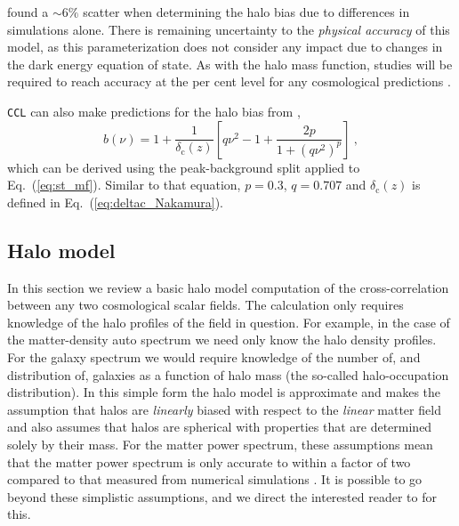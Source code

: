 \documentclass[\docopts]{\docclass}
\newcommand{\ccl}{{\tt CCL}\xspace}
\begin{document}
\citet{Tinker2010} found a $\sim6\%$ scatter when determining the halo bias due to differences in simulations alone. There is remaining uncertainty to the {\em physical accuracy} of this model, as this parameterization does not consider any impact due to changes in the dark energy equation of state. As with the halo mass function, studies will be required to reach accuracy at the per cent level for any cosmological predictions \cite[e.g.]{Gao2005, Schulz2006, Smith2007, Croton2007, Parfrey2011, Sunayama2016, Villarreal2017, Mao2018}.

\ccl can also make predictions for the halo bias from \cite{Sheth1999},
\begin{equation}
b(\nu)=1+\frac{1}{\delta_\mathrm{c}(z)}\left[q\nu^2-1+\frac{2p}{1+(q\nu^2)^p}\right]\ ,
\label{eq:st_bias}
\end{equation}
which can be derived using the peak-background split applied to Eq.~(\ref{eq:st_mf}). Similar to that equation, $p=0.3$, $q=0.707$ and $\delta_\mathrm{c}(z)$ is defined in Eq.~(\ref{eq:deltac_Nakamura}).


\subsection{Halo model}
\label{sec:halo_model}

In this section we review a basic halo model computation \citep{Seljak2000,Peacock2000,Cooray2002} of the cross-correlation between any two cosmological scalar fields. The calculation only requires knowledge of the halo profiles of the field in question. For example, in the case of the matter-density auto spectrum we need only know the halo density profiles. For the galaxy spectrum we would require knowledge of the number of, and distribution of, galaxies as a function of halo mass (the so-called halo-occupation distribution). In this simple form the halo model is approximate and makes the assumption that halos are \emph{linearly} biased with respect to the \emph{linear} matter field and also assumes that halos are spherical with properties that are determined solely by their mass. For the matter power spectrum, these assumptions mean that the matter power spectrum is only accurate to within a factor of two compared to that measured from numerical simulations \citep{Mead2015}. It is possible to go beyond these simplistic assumptions, and we direct the interested reader to \cite{Cooray2002,Smith2007,Giocoli2010,Smith2011} for this.
\end{document}
